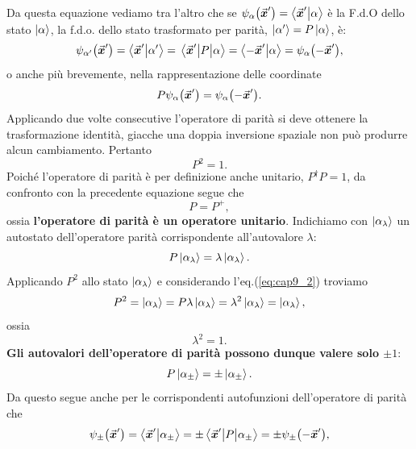 Da questa equazione vediamo tra l'altro che se $\psi_{\alpha}\qty(\va*{x}') = \braket{\va*{x}'}{\alpha}$ è la F.d.O dello stato $\ket{\alpha}$, la f.d.o. dello stato trasformato per parità, $\ket{\alpha'} = P\ket{\alpha}$, è:
\begin{equation}
  \psi_{\alpha'}\qty(\va*{x}') = \braket{\va*{x}'}{\alpha'} = \mel{\va*{x}'}{P}{\alpha} = \braket{-\va*{x}'}{\alpha} = \psi_{\alpha}\qty(-\va*{x}')  ,
\end{equation}
o anche più brevemente, nella rappresentazione delle coordinate
\begin{equation}
  P\psi_{\alpha}\qty(\va*{x}') = \psi_{\alpha}\qty(-\va*{x}') .
\end{equation}
Applicando due volte consecutive l'operatore di parità si deve ottenere la trasformazione identità, giacche una doppia inversione spaziale non può produrre alcun cambiamento. Pertanto
\begin{equation}
  \label{eq:cap9_2}
  P^2 = 1 .
\end{equation}
Poiché l'operatore di parità è per definizione anche unitario, $P^{\dag}P=1$, da confronto con la precedente equazione segue che
\begin{equation}
  P= P^{+} ,
\end{equation}
ossia \textbf{l'operatore di parità è un operatore unitario}.
Indichiamo con $\ket{\alpha_{\lambda}}$ un autostato dell'operatore parità corrispondente all'autovalore $\lambda$:
\begin{equation}
  P\ket{\alpha_{\lambda}} = \lambda\ket{\alpha_{\lambda}} .
\end{equation}
Applicando $P^2$ allo stato $\ket{\alpha_{\lambda}}$ e considerando l'eq.(\ref{eq:cap9_2}) troviamo
\begin{equation}
  P^2 = \ket{\alpha_{\lambda}} = P\lambda\ket{\alpha_{\lambda}} = \lambda^2\ket{\alpha_{\lambda}} = \ket{\alpha_{\lambda}} ,
\end{equation}
ossia
\begin{equation}
  \lambda^2 = 1 .
\end{equation}
\textbf{Gli autovalori dell'operatore di parità possono dunque valere solo $\pm1$}:
\begin{equation}
  P\ket{\alpha_{\pm}} = \pm\ket{\alpha_{\pm}} .
\end{equation}
Da questo segue anche per le corrispondenti autofunzioni dell'operatore di parità che
\begin{equation}
  \psi_{\pm}\qty(\va*{x}') = \braket{\va*{x}'}{\alpha_{\pm}} = \pm\mel{\va*{x}'}{P}{\alpha_{\pm}} = \pm\psi_{\pm}\qty(-\va*{x}') ,
\end{equation}
